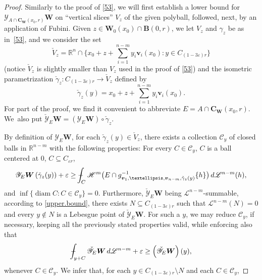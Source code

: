 \documentclass[11pt]{article}
\theoremstyle{definition}
\theoremstyle{jepanonymous}
\theoremstyle{plain}
\newcommand{\R}{\mathbb{R}}
\newcommand{\Rn}{\R^n}
\newcommand{\calC}{\mathscr{C}}
\newcommand{\calH}{\mathscr{H}}
\newcommand{\calL}{\mathscr{L}}
\newcommand{\calY}{\mathscr{Y}}
\newcommand{\bB}{{\boldsymbol{B}}}
\newcommand{\bC}{{\boldsymbol{C}}}
\newcommand{\bW}{{\boldsymbol{W}}}
\newcommand{\bv}{{\boldsymbol{v}}}
\DeclareMathOperator{\rmdiam}{\mathrm{diam}}
\def\Xint#1{\mathchoice
{\XXint\displaystyle\textstyle{#1}}{\XXint\textstyle\scriptstyle{#1}}{\XXint\scriptstyle\scriptscriptstyle{#1}}{\XXint\scriptscriptstyle
\scriptscriptstyle{#1}}\!\int}
\def\XXint#1#2#3{{\setbox0=\hbox{$#1{#2#3}{\int}$}
\vcenter{\hbox{$#2#3$}}\kern-.5\wd0}}
\def\dashint{\Xint-}
\let\veps\varepsilon
\let\subset\subseteq
\begin{document}
\begin{proof}
Similarly to the proof of \ref{53}, we will first establish a lower bound for $\calY_{A \cap \bC_\bW(x_0,r)} \bW$ on ``vertical slices'' $V_z$ of the given polyball, followed, next, by an application of Fubini.
Given $z \in \bW_0(x_0) \cap \bB(0,r)$, we let $V_z$ and $\gamma_z$ be as in~\ref{53}, and we consider the set\vspace*{-3pt}
\begin{equation*}
\check{V}_z = \Rn \cap \bigl\{ x_0 + z + \textstyle\sum_{i=1}^{n-m} y_i \bv_i(x_0): y \in C_{(1-3\veps)r}\bigr\}
\end{equation*}
(notice $\check{V}_z$ is slightly smaller than $V_z$ used in the proof of \ref{53}) and the isometric parametrization $\check{\gamma}_z: C_{(1-3\veps)r} \to \check{V}_z$ defined by\vspace*{-3pt}
\begin{equation*}
\check{\gamma}_z(y) = x_0 + z + \sum_{i=1}^{n-m} y_i \bv_i(x_0).
\end{equation*}
For part of the proof, we find it convenient to abbreviate $E = A \cap \bC_\bW(x_0,r)$.
We~also put $\check {\calY}_{E} \bW = \left(\calY_{E} \bW \right) \circ \check{\gamma}_z$.
\par
By definition of $\calY_E \bW$, for each $\check{\gamma}_z(y) \in \check{V}_z$, there exists a collection $\calC_y$ of closed balls in $\R^{n-m}$ with the following properties: For every $C \in \calC_y$, $C$ is a ball centered at 0, $C \subset C_{\veps r}$,\vspace*{-3pt}
\begin{equation*}
\calY_E \bW \left(\check{\gamma}_z(y) \right) + \veps \geq \dashint_C \calH^m \bigl(E \cap g_{\bv_1,\ldots,\bv_{n-m},\check{\gamma}_z(y)}^{-1}\{h\} \bigr) \,d\calL^{n-m}(h),
\end{equation*}
and $\inf \{ \rmdiam C: C \in \calC_y \} = 0$.
Furthermore, $\check{\calY}_E \bW$ being $\calL^{n-m}$-summable, according to \ref{upper.bound}, there exists $N \subset C_{(1-3\veps)r}$ such that $\calL^{n-m}(N)=0$ and every $y \not \in N$ is a Lebesgue point of $\check{\calY}_E \bW$.
For such a $y$, we may reduce $\calC_y$, if necessary, keeping all the previously stated properties valid, while enforcing also that
\begin{equation*}
\dashint_{y+C} \check{\calY}_E \bW \,d\calL^{n-m} + \veps \geq \left(\check{\calY}_E \bW \right)(y),
\end{equation*}
whenever $C \in \calC_y$.
We infer that, for each $y \in C_{(1-3\veps)r} \setminus N$ and each $C \in \calC_y$,\vspace*{-5pt}

\end{proof}
\end{document}
